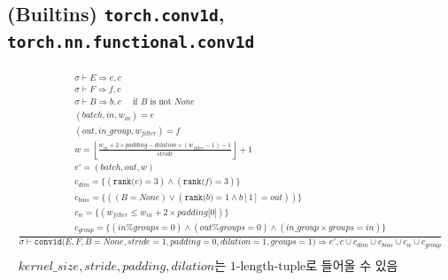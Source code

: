 \documentclass{article}
\newcommand{\x}{\times}
\newcommand{\rem}{\mtt{\%}}
\newcommand{\Rar}{\Rightarrow}
\newcommand{\ttt}[1]{\texttt{#1}}
\newcommand{\mtt}[1]{\mathtt{#1}}
\newcommand{\bigspace}{\,\,\,\,\,\,\,\,}
\newcommand{\op}[2]{\mtt{#1(}#2\mtt{)}}
\newcommand{\ind}[1]{\mtt{[}#1\mtt{]}}
\begin{document}
\subsection*{(Builtins) \ttt{torch.conv1d}, \ttt{torch.nn.functional.conv1d}}
\begin{align*}
  \frac
  {
    \begin{array}{l}
      \sigma \vdash E \Rar e, c \\
      \sigma \vdash F \Rar f, c \\
      \sigma \vdash B \Rar b, c \bigspace \text{if $B$ is not $None$} \\
      (batch, in, w_{in}) = e \\
      (out, in\_group, w_{filter}) = f \\
      w = \left\lfloor \frac{w_{in} + 2 \x padding - dilation
        \x (w_{filter} - 1) - 1}{stride} \right\rfloor + 1 \\
      e' = (batch, out, w) \\
      c_{dim} = \{ (\op{rank}{e} = 3) \land (\op{rank}{f} = 3) \} \\
      c_{bias} = \{ ((B = None) \lor (\op{rank}{b} = 1 \land b[1] = out)) \} \\
      c_w = \{ (w_{filter} \leq w_{in} + 2 \x padding \ind{0}) \} \\
      c_{group} = \{ (in \rem groups = 0) \land (out \rem groups = 0)
        \land (in\_group \x groups = in)\}
    \end{array}
  }
  {
    \sigma \vdash \op{conv1d}{E, F, B=None, stride=1, padding=0,
      dilation=1, groups=1} \Rar e', c \cup c_{dim} \cup c_{bias} \cup 
      c_w \cup c_{group}
  } \\
  \\
  \text{$kernel\_size, stride, padding, dilation$는 1-length-tuple로 들어올
  수 있음}
\end{align*}%
\end{document}
